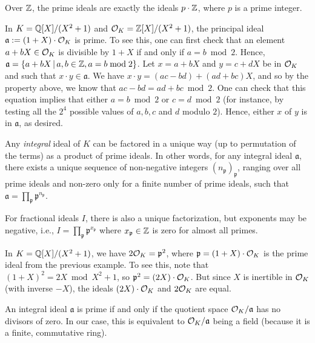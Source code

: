 \begin{example}
Over $\mathbb{Z}$, the prime ideals are exactly the ideals $p \cdot \mathbb{Z}$, where $p$ is a prime integer.

In $K = \mathbb{Q}[X]/(X^2+1)$ and $\mathcal{O}_K = \mathbb{Z}[X]/(X^2+1)$, the principal ideal $\mathfrak{a} := (1+X) \cdot \mathcal{O}_K$ is prime. To see this, one can first check that an element $a + bX \in \mathcal{O}_K$ is divisible by $1+X$ if and only if $a = b \bmod 2$. Hence, $\mathfrak{a} = \{a + bX \,|\, a, b \in \mathbb{Z}, a = b \bmod 2\}$. Let $x = a+bX$ and $y = c+dX$ be in $\mathcal{O}_K$ and such that $x \cdot y \in \mathfrak{a}$. We have $x \cdot y = (ac-bd) + (ad+bc)X$, and so by the property above, we know that $ac-bd = ad+bc \bmod 2$. One can check that this equation implies that either $a = b \bmod 2$ or $c = d \bmod 2$ (for instance, by testing all the $2^4$ possible values of $a,b,c$ and $d$ modulo $2$). Hence, either $x$ of $y$ is in $\mathfrak{a}$, as desired.
\end{example}

\begin{lemma}
Any \emph{integral} ideal of $K$ can be factored in a unique way (up to permutation of the terms) as a product of prime ideals. In other words, for any integral ideal $\mathfrak{a}$, there exists a unique sequence of non-negative integers $(n_\mathfrak{p})_{\mathfrak{p}}$, ranging over all prime ideals and non-zero only for a finite number of prime ideals, such that $\mathfrak{a} = \prod_{\mathfrak{p}} \mathfrak{p}^{n_\mathfrak{p}}$.

\noindent For fractional ideals $I$, there is also a unique factorization, but exponents may be negative, i.e., $I = \prod_{\mathfrak{p}} \mathfrak{p}^{x_\mathfrak{p}}$ where $x_\mathfrak{p} \in \mathbb{Z}$ is zero for almost all primes.
\end{lemma}

\begin{example}
In $K = \mathbb{Q}[X]/(X^2+1)$, we have $2 \mathcal{O}_K = \mathfrak{p}^2$, where $\mathfrak{p} = (1+X) \cdot \mathcal{O}_K$ is the prime ideal from the previous example. To see this, note that $(1+X)^2 = 2X \bmod X^2+1$, so $\mathfrak{p}^2 = (2X) \cdot \mathcal{O}_K$. But since $X$ is inertible in $\mathcal{O}_K$ (with inverse $-X$), the ideals $(2X) \cdot \mathcal{O}_K$ and $2 \mathcal{O}_K$ are equal.
\end{example}

\begin{lemma}
An integral ideal $\mathfrak{a}$ is prime if and only if the quotient space $\mathcal{O}_K/\mathfrak{a}$ has no divisors of zero. In our case, this is equivalent to $\mathcal{O}_K/\mathfrak{a}$ being a field (because it is a finite, commutative ring).
\end{lemma}

